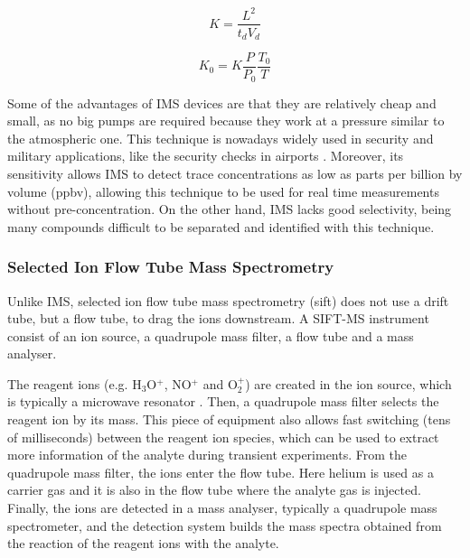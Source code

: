 \begin{equation}
K = \frac{L^2}{t_d V_d}
\label{eq:k}
\end{equation}

\begin{equation}
K_0 = K\frac{P}{P_0}\frac{T_0}{T}
\label{eq:k0}
\end{equation}





Some of the advantages of IMS devices are that they are relatively cheap and small, as  no big pumps are required because they work at a pressure similar to the atmospheric one.
This technique is nowadays widely used in security and military applications, like the security checks in airports \cite{borsdorf2006ion}. 
Moreover, its sensitivity allows IMS to detect trace concentrations as low as parts per billion by volume (\acrshort{ppbv}), allowing this technique to be used for real time measurements without pre-concentration. On the other hand, IMS lacks good selectivity, being many compounds difficult to be %
separated and identified with this technique.













\subsubsection{Selected Ion Flow Tube Mass Spectrometry}
Unlike IMS, selected ion flow tube mass spectrometry (\acrshort{sift}) does not use a drift tube, but a flow tube, to drag the ions downstream. 
A SIFT-MS instrument consist of an ion source, a quadrupole mass filter, a flow tube and a mass analyser.

The reagent ions (e.g. H$_3$O$^+$, NO$^+$ and O$_2^+$) are created in the ion source, which is typically a microwave resonator \cite{smith2005selected}.
Then, a quadrupole mass filter  selects the reagent ion by its mass. This piece of equipment also allows fast switching (tens of milliseconds) between the reagent ion species, which can be used to extract more information of the analyte during transient experiments. From the quadrupole mass filter, the ions enter the flow tube. Here helium is used as a carrier gas and it is also in the flow tube where the analyte gas is injected. Finally, the ions are detected in a mass analyser, typically a quadrupole mass spectrometer, and the detection system builds the mass spectra obtained from the reaction of the reagent ions with the analyte.



